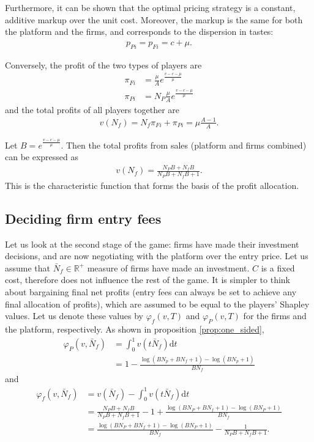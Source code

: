 \documentclass[a4paper]{article}
\newcommand{\dt}{\mathrm{d}t}
\begin{document}
Furthermore, it can be shown that the optimal pricing strategy is a constant, additive markup over the unit cost. Moreover, the markup is the same for both the platform and the firms, and corresponds to the dispersion in tastes:
\begin{align*}
    p_{Pi} = p_{Fi} = c + \mu.
\end{align*}

Conversely, the profit of the two types of players are
\begin{align*}
    \pi_{Fi} &= \frac{\mu}{A} e^\frac{v - c - \mu}{\mu} \\
    \pi_{Pi} &= N_P \frac{\mu}{A} e^\frac{v - c - \mu}{\mu}
\end{align*}
and the total profits of all players together are
\begin{align*}
    v(N_f) = N_f \pi_{Fi} + \pi_{Pi} = \mu \frac{A - 1}{A}.
\end{align*}

Let $B = e^\frac{v - c - \mu}{\mu}$. Then the total profits from sales (platform and firms combined) can be expressed as
\begin{align*}
    v(N_f) = \frac{N_P B + N_f B}{N_P B + N_f B + 1}.
\end{align*}
This is the characteristic function that forms the basis of the profit allocation. 

\subsection{Deciding firm entry fees}

Let us look at the second stage of the game: firms have made their investment decisions, and are now negotiating with the platform over the entry price. Let us assume that $\bar{N}_f \in \mathbb{R}^+$ measure of firms have made an investment. $C$ is a fixed cost, therefore does not influence the rest of the game. It is simpler to think about bargaining final net profits (entry fees can always be set to achieve any final allocation of profits), which are assumed to be equal to the players' Shapley values. Let us denote these values by $\varphi_f(v, T)$ and $\varphi_P(v, T)$ for the firms and the platform, respectively. As shown in proposition \ref{prop:one_sided},
\begin{align*}
    \varphi_P(v, \bar{N}_f) &= \int_0^1 v(t \bar{N}_f) \dt \\
    &= 1 - \frac{\log(BN_p + BN_f + 1) - \log(BN_p + 1)}{BN_f}
\end{align*}
and
\begin{align*}
    \varphi_f(v, \bar{N}_f) &= v(\bar{N}_f) - \int_0^1 v(t \bar{N}_f) \dt \\
    &= \frac{N_P B + N_f B}{N_P B + N_f B + 1} - 1 + \frac{\log(BN_P + BN_f + 1) - \log(BN_P + 1)}{BN_f} \\
    &= \frac{\log(BN_P + BN_f + 1) - \log(BN_P + 1)}{BN_f} - \frac{1}{N_P B + N_f B + 1}.
\end{align*}
\end{document}
